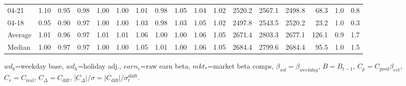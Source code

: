 \begin{threeparttable}
{\begin{tabular}{lrrrrrrrrrrrrrrrr}
  04-21 &   1.10 &   0.95 &         0.98 &     1.00 &           1.00 &        1.01 &        0.98 &        1.05 &          1.04 &          1.02 & 2520.2 & 2567.1 & 2498.8 &       68.3 &                      1.0 &                 0.8 \\
  04-18 &   0.95 &   0.90 &         0.97 &     1.00 &           1.00 &        1.03 &        0.98 &        1.03 &          1.05 &          1.02 & 2497.8 & 2543.5 & 2520.2 &       23.2 &                      1.0 &                 0.3 \\
Average &   1.01 &   0.96 &         0.97 &     1.01 &           1.01 &        1.06 &        1.00 &        1.00 &          1.06 &          1.05 & 2671.4 & 2803.3 & 2677.1 &      126.1 &                      0.9 &                 1.7 \\
 Median &   1.00 &   0.97 &         0.97 &     1.00 &           1.00 &        1.05 &        1.01 &        1.00 &          1.06 &          1.05 & 2684.4 & 2799.6 & 2684.4 &       95.5 &                      1.0 &                 1.5 \\
\bottomrule
\end{tabular}
}
\begin{tablenotes}\footnotesize
\item $wd_b$=weekday base, $wd_h$=holiday adj.,
$earn_r$=raw earn beta, $mkt_{*}$=market beta comps,
$\beta_{wd}=\beta_{weekday}$, $B=B_{t-1}$,
$C_p=C_{\text{pred}}\beta_{evt}$, $C_r=C_{\text{real}}$,
$C_\Delta=C_{\text{diff}}$, $|C_\Delta|/\sigma=|C_{\text{diff}}|/\sigma_t^{\text{shift}}$.
\end{tablenotes}
\end{threeparttable}
\endgroup
